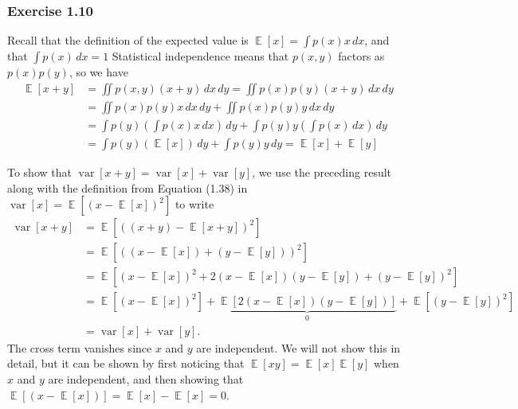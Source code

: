 \documentclass[12pt, a4paper]{article}
\DeclareMathOperator{\E}{\mathbb{E}}
\DeclareMathOperator{\var}{\operatorname{var}}
\begin{document}
\subsubsection*{Exercise 1.10}
Recall that the definition of the expected value is
$\E\left[x\right] = \int p(x) x \, dx$, and that $\int p(x) \, dx = 1$
Statistical independence means that $p(x, y)$ factors as $p(x)p(y)$, so we have
\begin{align*}
	\E\left[x + y\right] &= \iint p(x, y) (x+y) \, dx \, dy 
	= \iint p(x) p(y) (x+y) \, dx \, dy \tag{independence} \\
	&= \iint p(x) p(y) x \, dx \, dy + \iint p(x) p(y) y \, dx \, dy \\
	&= \int p(y) \left( \int  p(x)  x \, dx \right) \, dy + \int p(y) y \left( \int p(x)  \, dx \right) \, dy \\
	&= \int p(y) \left( \E \left[ x \right] \right) \, dy + \int p(y) y \, dy \tag{by definition} 
	= \E\left[x\right] + \E\left[y\right]
\end{align*}

To show that $\var\left[x + y\right] = \var\left[x\right] + \var\left[y\right]$, we use the preceding result along with the definition from Equation (1.38) in \cite{bishop_pattern_2011}  $\var\left[x\right] = \E\left[ (x - \E\left[x\right])^2\right]$ to write
\begin{align*}
	\var\left[x + y\right] &= \E\left[ \left( (x + y) - \E \left[ x + y \right] \right)^2\right] \\
	&= \E\left[ \left( \left(x - \E\left[x\right]\right) + \left(y - \E\left[y\right]\right) \right)^2\right] \tag{rearranging} \\
	&= \E\left[  \left(x - \E\left[x\right]\right)^2 + 2 \left(x - \E\left[x\right]\right) \left(y - \E\left[y\right]\right) + \left(y - \E\left[y\right]\right)^2\right] \\
	&= \E\left[  \left(x - \E\left[x\right]\right)^2 \right]
	+
	\underbrace{\E\left[   2 \left(x - \E\left[x\right]\right) \left(y - \E\left[y\right]\right) \right]}_{0}
	+
	\E\left[   \left(y - \E\left[y\right]\right)^2\right] \\
	&= \var\left[x\right] + \var\left[y\right].
\end{align*}
The cross term vanishes since $x$ and $y$ are independent.
We will not show this in detail, but it can be shown by first noticing that $\E \left[xy\right] = \E \left[x\right] \E \left[y\right]$ when $x$ and $y$ are independent, and then showing that $\E\left[    \left(x - \E\left[x\right]\right) \right] = \E\left[ x \right] - \E\left[ x \right] = 0$.
\end{document}

